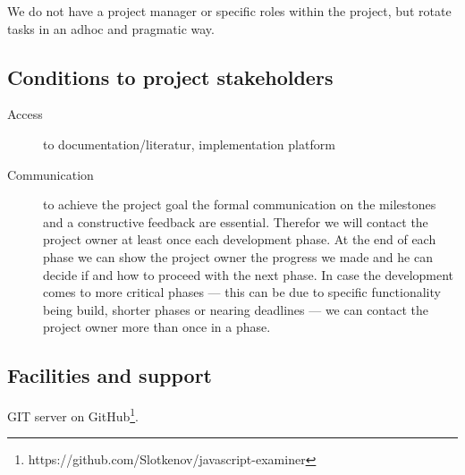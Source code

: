 \documentclass{article}
\begin{document}
We do not have a project manager or specific roles within the project, but 
rotate tasks in an adhoc and pragmatic way. 

\subsection{Conditions to project stakeholders} 

\begin{description}
  \item[Access]
    to documentation/literatur, implementation platform 
  \item[Communication]
    to achieve the project goal the formal communication on the milestones and
    a constructive feedback are essential. Therefor we will contact the project
    owner at least once each development phase. At the end of each phase we can
    show the project owner the progress we made and he can decide if and how to
    proceed with the next phase. In case the development comes to more critical
    phases --- this can be due to specific functionality being build, shorter
    phases or nearing deadlines --- we can contact the project owner more than
    once in a phase.
\end{description}

\subsection{Facilities and support}

GIT server on GitHub\footnote{https://github.com/Slotkenov/javascript-examiner}.
\end{document}
